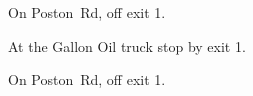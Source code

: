 
\begin{LocationList}

On Poston~Rd, off  exit 1.

At the Gallon Oil truck stop by  exit 1.

On Poston~Rd, off  exit 1.

\end{LocationList}
